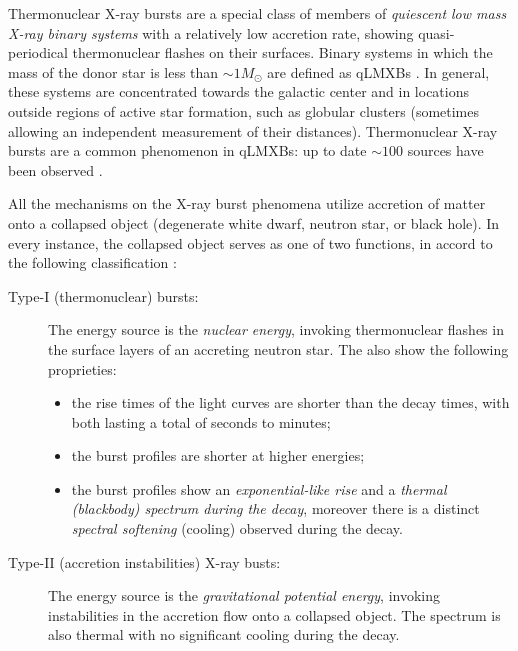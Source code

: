 { 

\quad


Thermonuclear X-ray bursts are a special class of  members of {\it quiescent low mass X-ray binary systems} with a relatively low accretion rate, showing quasi-periodical thermonuclear flashes on their surfaces. Binary systems in which the mass of the donor star is less than $\sim 1 M_{\odot}$ are defined as qLMXBs \cite{WLP80}. In general, these systems are concentrated towards the galactic center and in locations outside regions of active star formation, such as globular clusters (sometimes allowing an independent measurement of their distances). Thermonuclear X-ray bursts are a common phenomenon in qLMXBs: up to date $\sim 100$ sources have been observed \cite{LIST}. 

\quad



All the mechanisms on the X-ray burst phenomena utilize accretion of matter onto a collapsed object (\ie degenerate white dwarf, neutron star, or black hole). In every instance, the collapsed object serves as one of two functions, in accord to the following classification \cite{WLP80}:

\begin{description}
\item[Type-I (thermonuclear) bursts:] The energy source is the {\it nuclear energy}, invoking thermonuclear flashes in the surface layers of an accreting neutron star. The also show the following proprieties:
\begin{itemize}
\item the rise times of the light curves are shorter than the decay times, with both lasting a total of seconds to minutes;
\item the burst profiles are shorter at higher energies;
\item  the burst profiles show an {\it exponential-like rise} and a {\it thermal (blackbody) spectrum
during the decay}, moreover there is a  distinct {\it spectral softening} (cooling) observed during the decay.
\end{itemize}

\item[Type-II (accretion instabilities) X-ray busts:] The energy source is the {\it gravitational potential energy}, invoking instabilities in the accretion flow onto a collapsed object. The spectrum is also thermal with no significant cooling during the decay.

\end{description}
 


}
